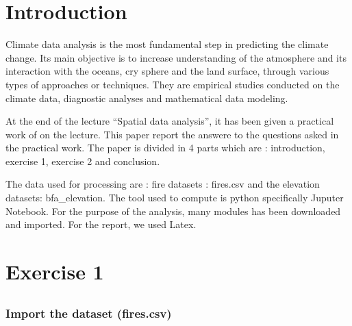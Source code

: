\documentclass[11pt,a4paper]{article}
\begin{document}
  
\section *{Introduction}
 Climate data analysis is the most fundamental step in predicting the
climate change. Its main objective is to increase understanding of the
atmosphere and its interaction with the oceans, cry sphere and the land
surface, through various types of approaches or techniques. They are
empirical studies conducted on the climate data, diagnostic analyses and
mathematical data modeling.

At the end of the lecture ``Spatial data analysis'', it has been given a
practical work of on the lecture. This paper report the answere to the
questions asked in the practical work. The paper is divided in 4 parts
which are : introduction, exercise 1, exercise 2 and conclusion.

The data used for processing are : fire datasets : fires.csv and the
elevation datasets: bfa\_elevation. The tool used to compute is python specifically Juputer Notebook.
For the purpose of the analysis, many modules has been downloaded and
imported. For the report, we used Latex.
 
\section {Exercise 1}

    \hypertarget{import-the-dataset-fires.csv}{%
\subsection{}
\subsubsection {Import the dataset
(fires.csv)}\label{import-the-dataset-fires.csv}}
\end{document}
